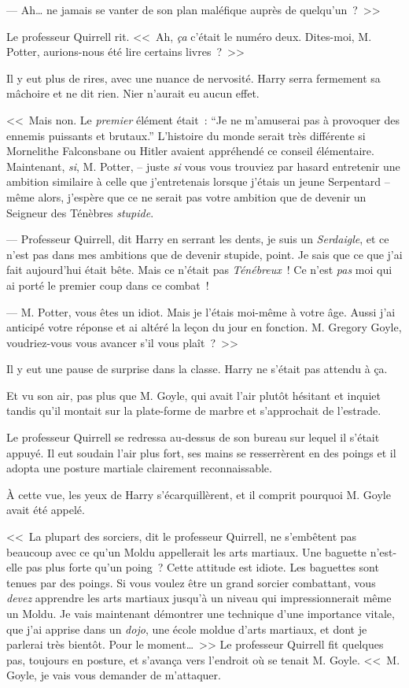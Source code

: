 --- Ah… ne jamais se vanter de son plan maléfique auprès de quelqu'un~?~>>

Le professeur Quirrell rit. <<~Ah, \emph{ça} c'était le numéro deux. Dites-moi, M. Potter, aurions-nous été lire certains livres~?~>>

Il y eut plus de rires, avec une nuance de nervosité. Harry serra fermement sa mâchoire et ne dit rien. Nier n'aurait eu aucun effet.

<<~Mais non. Le \emph{premier} élément était~: “Je ne m'amuserai pas à provoquer des ennemis puissants et brutaux.” L'histoire du monde serait très différente si Mornelithe Falconsbane ou Hitler avaient appréhendé ce conseil élémentaire. Maintenant, \emph{si}, M. Potter, -- juste \emph{si} vous vous trouviez par hasard entretenir une ambition similaire à celle que j'entretenais lorsque j'étais un jeune Serpentard -- même alors, j'espère que ce ne serait pas votre ambition que de devenir un Seigneur des Ténèbres \emph{stupide}.

--- Professeur Quirrell, dit Harry en serrant les dents, je suis un \emph{Serdaigle}, et ce n'est pas dans mes ambitions que de devenir stupide, point. Je sais que ce que j'ai fait aujourd'hui était bête. Mais ce n'était pas \emph{Ténébreux}~! Ce n'est \emph{pas} moi qui ai porté le premier coup dans ce combat~!

--- M. Potter, vous êtes un idiot. Mais je l'étais moi-même à votre âge. Aussi j'ai anticipé votre réponse et ai altéré la leçon du jour en fonction. M. Gregory Goyle, voudriez-vous vous avancer s'il vous plaît~?~>>

Il y eut une pause de surprise dans la classe. Harry ne s'était pas attendu à ça.

Et vu son air, pas plus que M. Goyle, qui avait l'air plutôt hésitant et inquiet tandis qu'il montait sur la plate-forme de marbre et s'approchait de l'estrade.

Le professeur Quirrell se redressa au-dessus de son bureau sur lequel il s'était appuyé. Il eut soudain l'air plus fort, ses mains se resserrèrent en des poings et il adopta une posture martiale clairement reconnaissable.

À cette vue, les yeux de Harry s'écarquillèrent, et il comprit pourquoi M. Goyle avait été appelé.

<<~La plupart des sorciers, dit le professeur Quirrell, ne s'embêtent pas beaucoup avec ce qu'un Moldu appellerait les arts martiaux. Une baguette n'est-elle pas plus forte qu'un poing~? Cette attitude est idiote. Les baguettes sont tenues par des poings. Si vous voulez être un grand sorcier combattant, vous \emph{devez} apprendre les arts martiaux jusqu'à un niveau qui impressionnerait même un Moldu. Je vais maintenant démontrer une technique d'une importance vitale, que j'ai apprise dans un \emph{dojo}, une école moldue d'arts martiaux, et dont je parlerai très bientôt. Pour le moment…~>> Le professeur Quirrell fit quelques pas, toujours en posture, et s'avança vers l'endroit où se tenait M. Goyle. <<~M. Goyle, je vais vous demander de m'attaquer.

